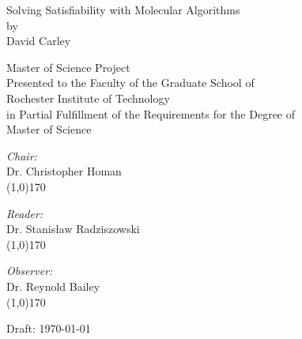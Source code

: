 \begin{titlepage}

	\begin{center}
	
	
		{\LARGE Solving {\sc Satisfiability} with Molecular Algorithms}\\[1.5cm]
		by\\
		\vspace{0.5cm}
		{\large David Carley}\\

		\vspace{1cm}
		
{\large Master of Science Project}\\
				\vspace{0.5cm}
Presented to the Faculty of the Graduate School of\\
		\vspace{0.5cm}				
Rochester Institute of Technology\\
		\vspace{0.5cm}
in Partial Fulfillment of the Requirements for the Degree of\\
		\vspace{0.5cm}
{\large Master of Science}
		
		\vspace{1cm}
		
		
	
		\begin{minipage}{0.4\textwidth}
			\begin{flushleft} \large

			\end{flushleft}
			\end{minipage}
			\begin{minipage}{0.4\textwidth}
			\begin{flushleft} \large

				\emph{Chair:} \\
				Dr. Christopher Homan
				\vspace{1cm}\\
				\line(1,0){170}\\
				\vspace{0.2cm}

				\emph{Reader:} \\
				Dr. Stanis\l aw Radziszowski
				\vspace{1cm}\\
				\line(1,0){170}\\
				\vspace{0.2cm}
				
				\emph{Observer:} \\
				Dr. Reynold Bailey
				\vspace{1cm}\\
				\line(1,0){170}
				
			\end{flushleft}
		\end{minipage}
	
		\vfill
		
		{\large Draft: \today}
	
	\end{center}

\end{titlepage}